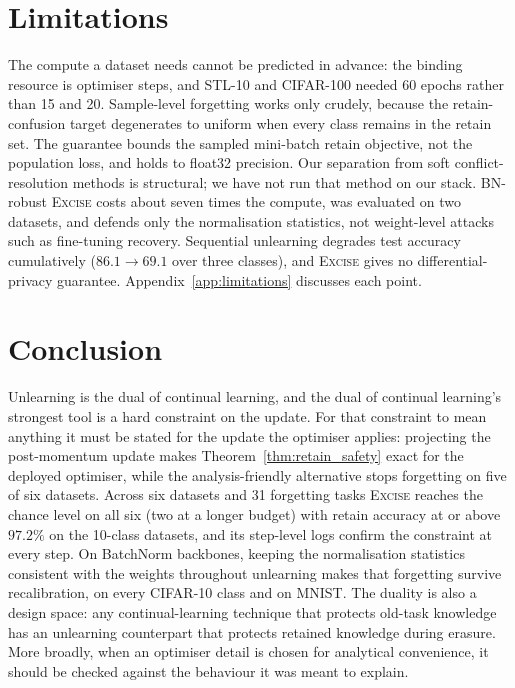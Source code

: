 \documentclass{article}
\newcommand{\ours}{\textsc{Excise}}
\newcommand{\added}[1]{{\color{revised}#1}}
\theoremstyle{remark}
\theoremstyle{plain}
\begin{document}
\section{Limitations}\label{sec:limitations}

The compute a dataset needs cannot be predicted in advance: the binding resource
is optimiser steps, and STL-10 and CIFAR-100 needed 60 epochs rather than 15 and
20. Sample-level forgetting works only crudely, because the retain-confusion
target degenerates to uniform when every class remains in the retain set. The
guarantee bounds the sampled mini-batch retain objective, not the population
loss, and holds to float32 precision. Our separation from soft
conflict-resolution methods \citep{patel2025learning} is structural; we have not
run that method on our stack. \added{BN-robust \ours{} costs about seven times
the compute, was evaluated on two datasets, and defends only the normalisation
statistics, not weight-level attacks such as fine-tuning recovery.} Sequential
unlearning degrades test accuracy cumulatively ($86.1 \to 69.1$ over three
classes), and \ours{} gives no differential-privacy guarantee.
Appendix~\ref{app:limitations} discusses each point.

\section{Conclusion}\label{sec:conclusion}

Unlearning is the dual of continual learning, and the dual of continual
learning's strongest tool is a hard constraint on the update. For that
constraint to mean anything it must be stated for the update the optimiser
applies: projecting the post-momentum update makes
Theorem~\ref{thm:retain_safety} exact for the deployed optimiser, while the
analysis-friendly alternative stops forgetting on five of six datasets. Across
six datasets and 31 forgetting tasks \ours{} reaches the chance level on all six
(two at a longer budget) with retain accuracy at or above $97.2\%$ on the
10-class datasets, and its step-level logs confirm the constraint at every step.
\added{On BatchNorm backbones, keeping the normalisation statistics consistent
with the weights throughout unlearning makes that forgetting survive
recalibration, on every CIFAR-10 class and on MNIST.} The duality is also a
design space: any continual-learning technique that protects old-task
knowledge has an unlearning counterpart that protects retained knowledge during
erasure. More broadly, when an
optimiser detail is chosen for analytical convenience, it should be checked
against the behaviour it was meant to explain.
\end{document}
